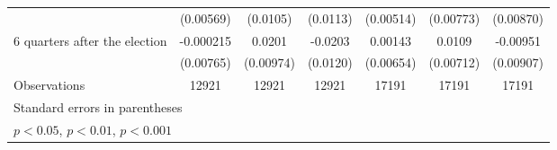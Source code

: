 \begin{table}[htbp]
\begin{tabular}{l*{6}{c}}
                    &   (0.00569)         &    (0.0105)         &    (0.0113)         &   (0.00514)         &   (0.00773)         &   (0.00870)         \\
[1em]
 6 quarters after the election&   -0.000215         &      0.0201\sym{*}  &     -0.0203         &     0.00143         &      0.0109         &    -0.00951         \\
                    &   (0.00765)         &   (0.00974)         &    (0.0120)         &   (0.00654)         &   (0.00712)         &   (0.00907)         \\
\hline
Observations        &       12921         &       12921         &       12921         &       17191         &       17191         &       17191         \\
\hline\hline
\multicolumn{7}{l}{\footnotesize Standard errors in parentheses}\\
\multicolumn{7}{l}{\footnotesize \sym{*} \(p<0.05\), \sym{**} \(p<0.01\), \sym{***} \(p<0.001\)}\\
\end{tabular}
\end{table}
